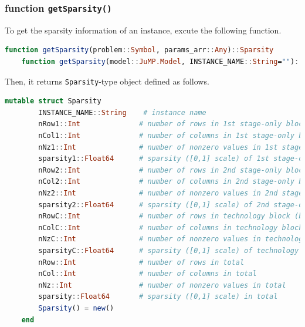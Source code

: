 \documentclass{hitec}
\begin{document}
	\subsubsection{function \texttt{getSparsity()}}
	To get the sparsity information of an instance, excute the following function.
	\begin{lstlisting}[frame=single,language=julia]
	function getSparsity(problem::Symbol, params_arr::Any)::Sparsity
	function getSparsity(model::JuMP.Model, INSTANCE_NAME::String="")::Sparsity
	\end{lstlisting}
	Then, it returns \texttt{Sparsity}-type object defined as follows.
	\begin{lstlisting}[frame=single,language=julia]
	mutable struct Sparsity
		INSTANCE_NAME::String    # instance name
		nRow1::Int              # number of rows in 1st stage-only block (block A)
		nCol1::Int              # number of columns in 1st stage-only block (block A)
		nNz1::Int               # number of nonzero values in 1st stage-only block (block A)
		sparsity1::Float64      # sparsity ([0,1] scale) of 1st stage-only block (block A)
		nRow2::Int              # number of rows in 2nd stage-only block (block W)
		nCol2::Int              # number of columns in 2nd stage-only block (block W)
		nNz2::Int               # number of nonzero values in 2nd stage-only block (block W)
		sparsity2::Float64      # sparsity ([0,1] scale) of 2nd stage-only block (block W)
		nRowC::Int              # number of rows in technology block (block T)
		nColC::Int              # number of columns in technology block (block T)
		nNzC::Int               # number of nonzero values in technology block (block T)  
		sparsityC::Float64      # sparsity ([0,1] scale) of technology block (block T)
		nRow::Int               # number of rows in total
		nCol::Int               # number of columns in total
		nNz::Int                # number of nonzero values in total
		sparsity::Float64       # sparsity ([0,1] scale) in total
		Sparsity() = new()
	end
	\end{lstlisting}
	
	\pagebreak
\end{document}
